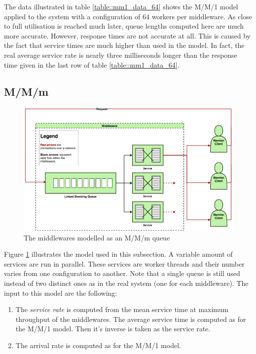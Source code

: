 \documentclass[11pt,a4paper]{article}
\begin{document}
The data illustrated in table \ref{table::mm1_data_64} shows the M/M/1 model applied to the system with a configuration of 64 workers per middleware. As close to full utilisation is reached much later, queue lengths computed here are much more accurate. However, response times are not accurate at all. This is caused by the fact that service times are much higher than used in the model. In fact, the real average service rate is nearly three milliseconds longer than the response time given in the last row of table \ref{table::mm1_data_64}.

\subsection{M/M/m}

\begin{figure}[!h]
    \centering
    \includegraphics[width=\textwidth]{processing/graphics/mmn_queue.png}
    \caption{The middlewares modelled as an M/M/m queue}
    \label{png::mmn_queue}
\end{figure}

Figure \ref{png::mmn_queue} illustrates the model used in this subsection. A variable amount of services are run in parallel. These services are worker threads and their number varies from one configuration to another. Note that a single queue is still used instead of two distinct ones as in the real system (one for each middleware). The input to this model are the following:

\begin{enumerate}
    \item The \textit{service rate} is computed from the mean service time at maximum throughput of the middlewares. The average service time is computed as for the M/M/1 model. Then it's inverse is taken as the service rate.
    \item The arrival rate is computed as for the M/M/1 model.
\end{enumerate}
\end{document}
